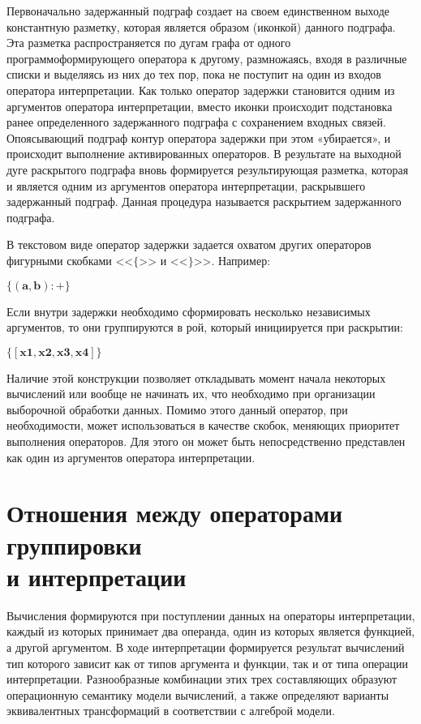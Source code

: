 Первоначально задержанный подграф создает на своем единственном выходе константную разметку, которая является образом (иконкой) данного подграфа. Эта разметка распространяется по дугам графа от одного программоформирующего оператора к другому, размножаясь, входя в различные списки и выделяясь из них до тех пор, пока не поступит на один из входов оператора интерпретации. Как только оператор задержки становится одним из аргументов оператора интерпретации, вместо иконки происходит подстановка ранее определенного задержанного подграфа с сохранением входных связей. Опоясывающий подграф контур оператора задержки при этом «убирается», и происходит выполнение активированных операторов. В результате на выходной дуге раскрытого подграфа вновь формируется результирующая разметка, которая и является одним из аргументов оператора интерпретации, раскрывшего задержанный подграф. Данная процедура называется раскрытием задержанного подграфа.

В текстовом виде оператор задержки задается охватом других операторов фигурными скобками <<$\mathbf{\{}$>> и <<$\mathbf{\}}$>>. Например:
\begin{center}
	$\mathbf{\{(a,b):+\}}$
\end{center}
Если внутри задержки необходимо сформировать несколько независимых аргументов, то они группируются в рой, который инициируется при раскрытии:
\begin{center}
	$\mathbf{\{[x1, x2, x3, x4]\}}$
\end{center}
Наличие этой конструкции позволяет откладывать момент начала некоторых вычислений или вообще не начинать их, что необходимо при организации выборочной обработки данных. Помимо этого данный оператор, при необходимости, может использоваться в качестве скобок, меняющих приоритет выполнения операторов. Для этого он может быть непосредственно представлен как один из аргументов оператора интерпретации.

\section{Отношения между операторами группировки \\и интерпретации}

Вычисления формируются при поступлении данных на операторы интерпретации, каждый из которых принимает два операнда, один из которых является функцией, а другой аргументом. В ходе интерпретации формируется результат вычислений тип которого зависит как от типов аргумента и функции, так и от типа операции интерпретации. Разнообразные комбинации этих трех составляющих образуют операционную семантику модели вычислений, а также определяют варианты эквивалентных трансформаций в соответствии с алгеброй модели.

